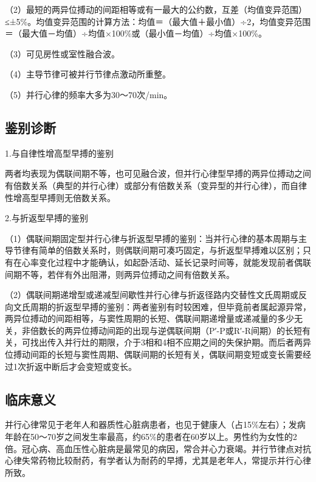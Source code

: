 （2）最短的两异位搏动的间距相等或有一最大的公约数，互差（均值变异范围）≤±5\%。均值变异范围的计算方法：均值＝（最大值＋最小值）÷2，均值变异范围＝（最大值－均值）÷均值×100\%或（最小值－均值）÷均值×100\%。

（3）可见房性或室性融合波。

（4）主导节律可被并行节律点激动所重整。

（5）并行心律的频率大多为30～70次/min。

\protect\hypertarget{text00023.htmlux5cux23subid280}{}{}

\subsection{鉴别诊断}

1.与自律性增高型早搏的鉴别

两者均表现为偶联间期不等，也可见融合波，但并行心律型早搏的两异位搏动之间有倍数关系（典型的并行心律）或部分有倍数关系（变异型的并行心律），而自律性增高型早搏则无倍数关系。

2.与折返型早搏的鉴别

（1）偶联间期固定型并行心律与折返型早搏的鉴别：当并行心律的基本周期与主导节律有简单的倍数关系时，则偶联间期可凑巧固定，与折返型早搏难以区别；只有在心率变化过程中才能确认，如起卧活动、延长记录时间等，就能发现前者偶联间期不等，若伴有外出阻滞，则两异位搏动之间有倍数关系。

（2）偶联间期递增型或递减型间歇性并行心律与折返径路内交替性文氏周期或反向文氏周期的折返型早搏的鉴别：两者鉴别有时较困难，但毕竟前者属起源异常，两异位搏动的间距相等，与窦性周期的长短、偶联间期递增量或递减量的多少无关，非倍数长的两异位搏动间距的出现与逆偶联间期（P′-P或R′-R间期）的长短有关，可找出传入并行灶的期限，介于3相和4相不应期之间的失保护期。而后者两异位搏动间距的长短与窦性周期、偶联间期的长短有关，偶联间期变短或变长需要经过1次折返中断后才会变短或变长。

\protect\hypertarget{text00023.htmlux5cux23subid281}{}{}

\subsection{临床意义}

并行心律常见于老年人和器质性心脏病患者，也见于健康人（占15\%左右）；发病年龄在50～70岁之间发生率最高，约65\%的患者在60岁以上。男性约为女性的2倍。冠心病、高血压性心脏病是最常见的病因，常合并心力衰竭。并行节律点对抗心律失常药物比较耐药，有学者认为耐药的早搏，尤其是老年人，常提示并行心律所致。

